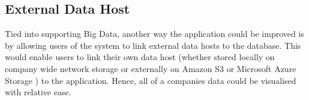 \documentclass[../dissertation.tex]{subfiles}
\begin{document}
\subsection{External Data Host}

Tied into supporting Big Data, another way the application could be improved is by allowing users of the system to link external data hosts to the database. This would enable users to link their own data host (whether stored locally on company wide network storage or externally on Amazon S3 \cite{amazons3} or Microsoft Azure Storage \cite{msftazure}) to the application. Hence, all of a companies data could be visualised with relative ease.
\end{document}
